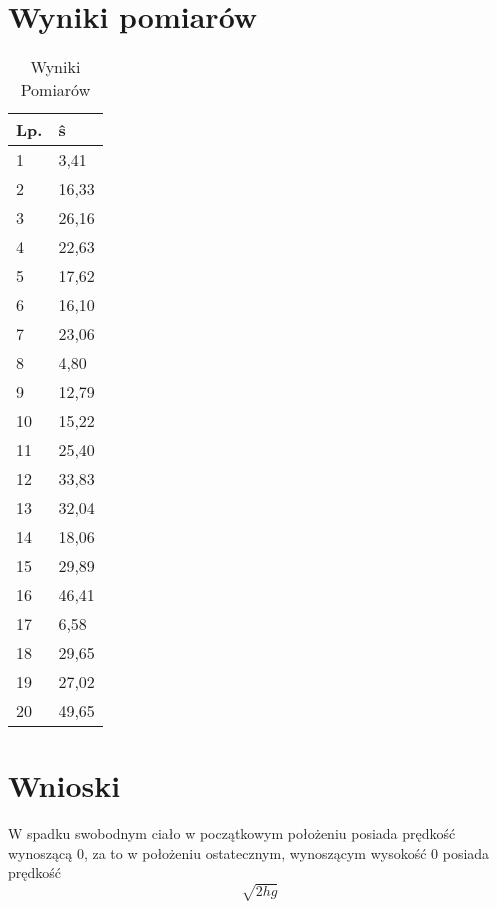 \documentclass{article}
\begin{document}
\section{Wyniki pomiarów}
\begin{table}[h]
\centering
\begin{tabular}{|l|l|}
\hline
Lp. & ŝ     \\ \hline
1   & 3,41  \\ \hline
2   & 16,33 \\ \hline
3   & 26,16 \\ \hline
4   & 22,63 \\ \hline
5   & 17,62 \\ \hline
6   & 16,10 \\ \hline
7   & 23,06 \\ \hline
8   & 4,80  \\ \hline
9   & 12,79 \\ \hline
10  & 15,22 \\ \hline
11  & 25,40 \\ \hline
12  & 33,83 \\ \hline
13  & 32,04 \\ \hline
14  & 18,06 \\ \hline
15  & 29,89 \\ \hline
16  & 46,41 \\ \hline
17  & 6,58  \\ \hline
18  & 29,65 \\ \hline
19  & 27,02 \\ \hline
20  & 49,65 \\ \hline
\end{tabular}
\caption{Wyniki Pomiarów}
\end{table}
\raggedright
\section{Wnioski}
W spadku swobodnym ciało w początkowym położeniu posiada prędkość wynoszącą 0, za to w położeniu ostatecznym, wynoszącym wysokość 0 posiada prędkość $$\sqrt{2hg}$$
    
\end{document}
